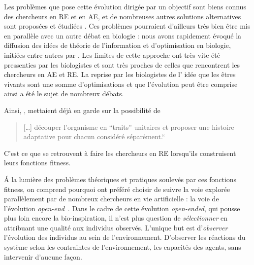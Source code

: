 Les problèmes que pose cette évolution dirigée par un objectif sont biens connus des chercheurs en RE et en AE, et de nombreuses autres solutions alternatives sont proposées et étudiées \citep{lehman10efficientlyevolvingprogramsthroughsearchnovelty,lehman2011abandoningobjectivesevolutionthroughthesearchfornoveltyalone,risi2009hownoveltysearchescapesthedeceptivetrapoflearningtolearn,mouret2012encouragingbehavioraldiversityinevolutionaryrobotics}. Ces problèmes pourraient d'ailleurs très bien être mis en parallèle avec un autre débat en biologie : nous avons rapidement évoqué la diffusion des idées de théorie de l'information et d'optimisation en biologie, initiées entre autres par \cite{maynardsmith78optimizationtheoryinevolution}. Les limites de cette approche ont très vite été pressenties par les biologistes et sont très proches de celles que rencontrent les chercheurs en AE et RE. La reprise par les biologistes de l' idée que les êtres vivants sont une somme d'optimisations et que l'évolution peut être comprise ainsi a été le sujet de nombreux débats.

Ainsi, \cite{gould1979spandrelssanmarcopanglossianparadigmcritiqueadaptationistprogramme}, mettaient déjà en garde sur la possibilité de

\begin{quote}

   [\ldots] découper l'organisme en ``traits'' unitaires et  proposer une histoire adaptative pour chacun considéré séparément.``

\end{quote}

C'est ce  que se retrouvent à faire les chercheurs en RE lorsqu'ils construisent leurs fonctions fitness.

\'A la lumière des problèmes théoriques et pratiques soulevés par ces fonctions fitness, on comprend pourquoi \cite{bredeche2012environmentdrivenopenende} ont préféré choisir de suivre la voie explorée parallèlement par de nombreux chercheurs en vie artificielle : la voie de l'évolution \emph{open-end}~\citep{ray91anapproachtothesynthesisoflife,adami94evolutionarylearninginthe2Dartificiallifesystemavida}. Dans le cadre de cette évolution \emph{open-ended}, qui pousse plus loin encore la bio-inspiration, il n'est plus question de \emph{sélectionner} en attribuant une qualité aux individus observés. L'unique but est d'\emph{observer} l'évolution des individus au sein de l'environnement. D'observer les réactions du système selon les contraintes de l'environnement, les capacités des agents, sans intervenir d'aucune façon.

